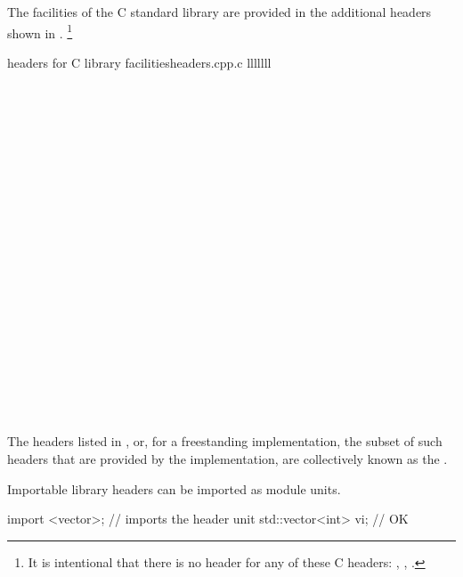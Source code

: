 \pnum
The facilities of the C standard library are provided in the
%
additional headers shown in .%
\footnote{It is intentional that there is no \Cpp{} header
for any of these C headers:
,
,
.}

\begin{multicolfloattable}{\Cpp{} headers for C library facilities}{headers.cpp.c}
{lllllll}
 \\
 \\
 \\
\columnbreak
{} \\
 \\
 \\
\columnbreak
{} \\
 \\
 \\
\columnbreak
{} \\
 \\
 \\
\columnbreak
{} \\
 \\
 \\
\columnbreak
{} \\
 \\
 \\
\columnbreak
{} \\
 \\
 \\
\end{multicolfloattable}

\pnum
The headers listed in , or,
for a freestanding implementation,
the subset of such headers that are provided by the implementation,
are collectively known as
the .
\begin{note}
Importable \Cpp{} library headers can be
imported as module units.
\end{note}
\begin{example}
\begin{codeblock}
import <vector>;               // imports the  header unit
std::vector<int> vi;           // OK
\end{codeblock}
\end{example}

